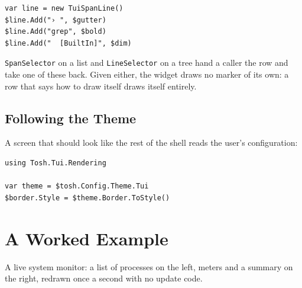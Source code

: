 \documentclass[11pt,a4paper,twoside,openany]{book}
\newcommand{\code}[1]{\texttt{\small #1}}
\begin{document}
\begin{lstlisting}
var line = new TuiSpanLine()
$line.Add("› ", $gutter)
$line.Add("grep", $bold)
$line.Add("  [BuiltIn]", $dim)
\end{lstlisting}

\code{SpanSelector} on a list and \code{LineSelector} on a tree hand a caller the
row and take one of these back. Given either, the widget draws no marker of its
own: a row that says how to draw itself draws itself entirely.

\section{Following the Theme}

A screen that should look like the rest of the shell reads the user's
configuration:

\begin{lstlisting}
using Tosh.Tui.Rendering

var theme = $tosh.Config.Theme.Tui
$border.Style = $theme.Border.ToStyle()
\end{lstlisting}

\chapter{A Worked Example}

A live system monitor: a list of processes on the left, meters and a summary on
the right, redrawn once a second with no update code.
\end{document}
